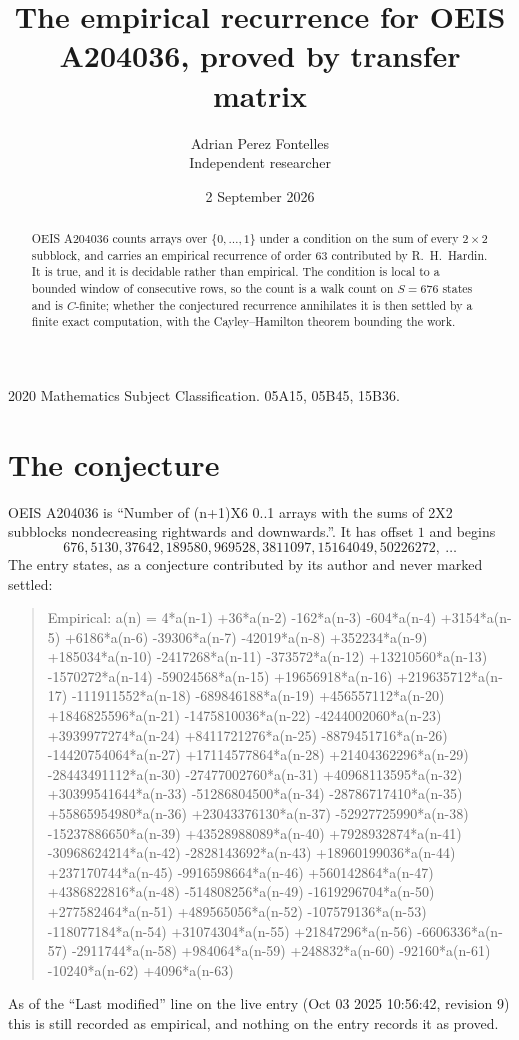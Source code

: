 \documentclass[11pt,a4paper]{article}
\title{The empirical recurrence for OEIS A204036, proved by transfer matrix}
\author{Adrian Perez Fontelles\\ \small Independent researcher}
\date{2 September 2026}
\theoremstyle{plain}
\theoremstyle{definition}
\begin{document}
\maketitle

\begin{abstract}
OEIS A204036 counts arrays over $\{0,\dots,1\}$ under a condition on the sum of every
$2\times2$ subblock, and carries an empirical recurrence of order $63$ contributed by
R.~H.~Hardin. It is true, and it is decidable rather than empirical. The condition is local to
a bounded window of consecutive rows, so the count is a walk count on $S=676$ states and is
$C$-finite; whether the conjectured recurrence annihilates it is then settled by a finite exact
computation, with the Cayley--Hamilton theorem bounding the work.
\end{abstract}

\noindent\small 2020 Mathematics Subject Classification. 05A15, 05B45, 15B36.\normalsize

\section{The conjecture}

OEIS A204036 is ``Number of (n+1)X6 0..1 arrays with the sums of 2X2 subblocks nondecreasing rightwards and downwards.''. It has offset $1$ and begins
\[
676, 5130, 37642, 189580, 969528, 3811097, 15164049, 50226272,\ \dots
\]
The entry states, as a conjecture contributed by its author and never marked settled:
\begin{quote}
Empirical: a(n) = 4*a(n-1) +36*a(n-2) -162*a(n-3) -604*a(n-4) +3154*a(n-5) +6186*a(n-6) -39306*a(n-7) -42019*a(n-8) +352234*a(n-9) +185034*a(n-10) -2417268*a(n-11) -373572*a(n-12) +13210560*a(n-13) -1570272*a(n-14) -59024568*a(n-15) +19656918*a(n-16) +219635712*a(n-17) -111911552*a(n-18) -689846188*a(n-19) +456557112*a(n-20) +1846825596*a(n-21) -1475810036*a(n-22) -4244002060*a(n-23) +3939977274*a(n-24) +8411721276*a(n-25) -8879451716*a(n-26) -14420754064*a(n-27) +17114577864*a(n-28) +21404362296*a(n-29) -28443491112*a(n-30) -27477002760*a(n-31) +40968113595*a(n-32) +30399541644*a(n-33) -51286804500*a(n-34) -28786717410*a(n-35) +55865954980*a(n-36) +23043376130*a(n-37) -52927725990*a(n-38) -15237886650*a(n-39) +43528988089*a(n-40) +7928932874*a(n-41) -30968624214*a(n-42) -2828143692*a(n-43) +18960199036*a(n-44) +237170744*a(n-45) -9916598664*a(n-46) +560142864*a(n-47) +4386822816*a(n-48) -514808256*a(n-49) -1619296704*a(n-50) +277582464*a(n-51) +489565056*a(n-52) -107579136*a(n-53) -118077184*a(n-54) +31074304*a(n-55) +21847296*a(n-56) -6606336*a(n-57) -2911744*a(n-58) +984064*a(n-59) +248832*a(n-60) -92160*a(n-61) -10240*a(n-62) +4096*a(n-63)
\end{quote}
As of the ``Last modified'' line on the live entry (Oct 03 2025 10:56:42, revision 9) this is still
recorded as empirical, and nothing on the entry records it as proved.
\end{document}
